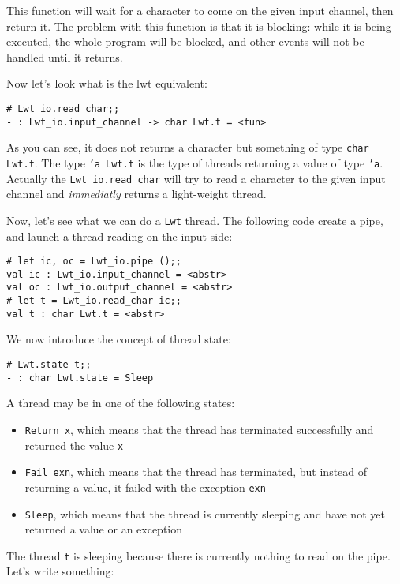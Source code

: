 \documentclass{article}
\newcommand{\lwt}{\texttt{Lwt}\xspace}
\begin{document}
This function will wait for a character to come on the given input
channel, then return it. The problem with this function is that it is
blocking: while it is being executed, the whole program will be
blocked, and other events will not be handled until it returns.

Now let's look what is the lwt equivalent:

\begin{verbatim}
# Lwt_io.read_char;;
- : Lwt_io.input_channel -> char Lwt.t = <fun>
\end{verbatim}

As you can see, it does not returns a character but something of type
\texttt{char Lwt.t}. The type \texttt{'a Lwt.t} is the type of threads
returning a value of type \texttt{'a}. Actually the
\texttt{Lwt\_io.read\_char} will try to read a character to the given
input channel and \emph{immediatly} returns a light-weight thread.

Now, let's see what we can do a \lwt thread. The following code create
a pipe, and launch a thread reading on the input side:

\begin{verbatim}
# let ic, oc = Lwt_io.pipe ();;
val ic : Lwt_io.input_channel = <abstr>
val oc : Lwt_io.output_channel = <abstr>
# let t = Lwt_io.read_char ic;;
val t : char Lwt.t = <abstr>
\end{verbatim}

We now introduce the concept of thread state:

\begin{verbatim}
# Lwt.state t;;
- : char Lwt.state = Sleep
\end{verbatim}

A thread may be in one of the following states:

\begin{itemize}
\item \texttt{Return x}, which means that the thread has terminated
  successfully and returned the value \texttt{x}
\item \texttt{Fail exn}, which means that the thread has terminated,
  but instead of returning a value, it failed with the exception
  \texttt{exn}
\item \texttt{Sleep}, which means that the thread is currently
  sleeping and have not yet returned a value or an exception
\end{itemize}

The thread \texttt{t} is sleeping because there is currently nothing
to read on the pipe. Let's write something:
\end{document}
